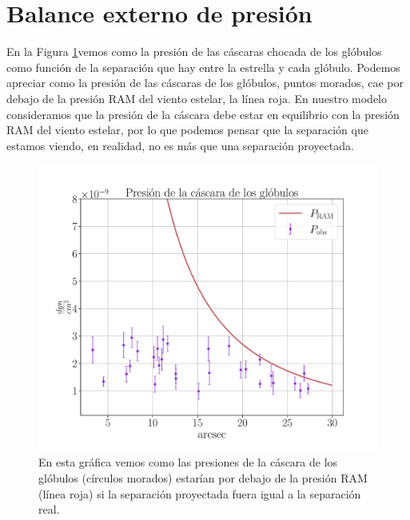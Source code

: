 \documentclass{book}
\begin{document}
\section{Balance externo de presión}\label{Sec:proyeccion}

En la Figura \ref{graf_presion}vemos como la presión de las cáscaras chocada de los glóbulos como función de la separación que hay entre la estrella y cada glóbulo. Podemos apreciar como la presión de las cáscaras de los glóbulos, puntos morados, cae por debajo de la presión RAM del viento estelar, la línea roja. En nuestro modelo consideramos que la presión de la cáscara debe estar en equilibrio con la presión RAM del viento estelar, por lo que podemos pensar que la separación que estamos viendo, en realidad, no es más que una separación proyectada. 

\begin{figure}[htb]
    \centering
    \includegraphics[width=\textwidth]{imagenes_corregidas/S_R.pdf}
    \caption{En esta gráfica vemos como las presiones de la cáscara de los glóbulos (círculos morados) estarían por debajo de la presión RAM (línea roja) si la separación proyectada fuera igual a la separación real.}
    \label{graf_presion}
\end{figure}
\end{document}
